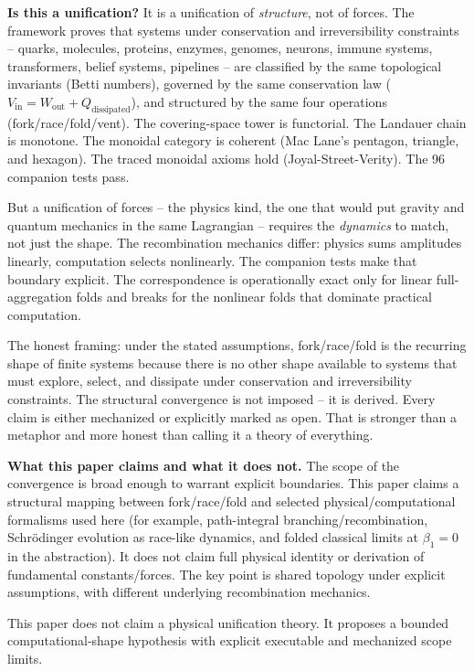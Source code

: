 \documentclass[
  11pt,
]{article}
\begin{document}
\textbf{Is this a unification?} It is a unification of \emph{structure},
not of forces. The framework proves that systems under conservation and
irreversibility constraints -- quarks, molecules, proteins, enzymes,
genomes, neurons, immune systems, transformers, belief systems,
pipelines -- are classified by the same topological invariants (Betti
numbers), governed by the same conservation law
(\(V_{\text{in}} = W_{\text{out}} + Q_{\text{dissipated}}\)), and
structured by the same four operations (fork/race/fold/vent). The
covering-space tower is functorial. The Landauer chain is monotone. The
monoidal category is coherent (Mac Lane's pentagon, triangle, and
hexagon). The traced monoidal axioms hold (Joyal-Street-Verity). The 96
companion tests pass.

But a unification of forces -- the physics kind, the one that would put
gravity and quantum mechanics in the same Lagrangian -- requires the
\emph{dynamics} to match, not just the shape. The recombination
mechanics differ: physics sums amplitudes linearly, computation selects
nonlinearly. The companion tests make that boundary explicit. The
correspondence is operationally exact only for linear full-aggregation
folds and breaks for the nonlinear folds that dominate practical
computation.

The honest framing: under the stated assumptions, fork/race/fold is the
recurring shape of finite systems because there is no other shape
available to systems that must explore, select, and dissipate under
conservation and irreversibility constraints. The structural convergence
is not imposed -- it is derived. Every claim is either mechanized or
explicitly marked as open. That is stronger than a metaphor and more
honest than calling it a theory of everything.

\textbf{What this paper claims and what it does not.} The scope of the
convergence is broad enough to warrant explicit boundaries. This paper
claims a structural mapping between fork/race/fold and selected
physical/computational formalisms used here (for example, path-integral
branching/recombination, Schrödinger evolution as race-like dynamics,
and folded classical limits at \(\beta_1 = 0\) in the abstraction). It
does not claim full physical identity or derivation of fundamental
constants/forces. The key point is shared topology under explicit
assumptions, with different underlying recombination mechanics.

This paper does not claim a physical unification theory. It proposes a
bounded computational-shape hypothesis with explicit executable and
mechanized scope limits.
\end{document}
